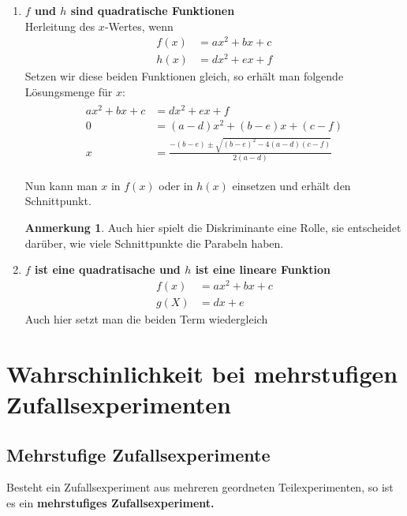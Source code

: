 \documentclass{report}
\theoremstyle{definition}
\theoremstyle{definition}
\theoremstyle{an}
\newtheorem{anm}{Anmerkung}[section]
\theoremstyle{lem}
\theoremstyle{def}
\theoremstyle{def}
\begin{document}
	\begin{enumerate}
		\item \textbf{$f$ und $h$ sind quadratische Funktionen} \\
		Herleitung des $x$-Wertes, wenn
		\begin{align}
			f(x)&=ax^2+bx+c \\
			h(x)&=dx^2+ex+f
		\end{align}
		Setzen wir diese beiden Funktionen gleich, so erhält man folgende Lösungsmenge für $x$:
		\begin{align}
			\begin{aligned}
			ax^2+bx+c &= dx^2+ex+f \\
			0 &= (a-d)x^2+(b-e)x+(c-f) \\
			x &= \frac{-(b-e)\pm \sqrt{(b-e)^2-4(a-d)(c-f)}}{2(a-d)}
			\end{aligned}
		\end{align}
		
		Nun kann man $x$ in $f(x)$ oder in $h(x)$ einsetzen und erhält den Schnittpunkt.
		
		\begin{anm}
			Auch hier spielt die Diskriminante eine Rolle, sie entscheidet darüber, wie viele Schnittpunkte die Parabeln haben. 
		\end{anm}
		
		\item \textbf{$f$ ist eine quadratisache und $h$ ist eine lineare Funktion} \\
		
		\begin{align}
		    f(x)&=ax^2+bx+c \\ 
		    g(X)&=dx+e
		\end{align}
		Auch hier setzt man die beiden Term wiedergleich
	\end{enumerate}

    \chapter{Wahrschinlichkeit bei mehrstufigen Zufallsexperimenten}
    \section{Mehrstufige Zufallsexperimente}
\begin{defi}
    Besteht ein Zufallsexperiment aus mehreren geordneten  Teilexperimenten, so ist es ein \textbf{mehrstufiges Zufallsexperiment.}
\end{defi}
\end{document}
